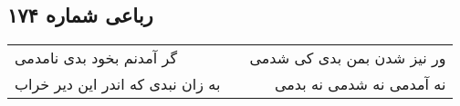 \begin{center}
\section*{رباعی شماره ۱۷۴}
\label{sec:sh174}
\begin{longtable}{l p{0.5cm} r}
گر آمدنم بخود بدی نامدمی
&&
ور نیز شدن بمن بدی کی شدمی
\\
به زان نبدی که اندر این دیر خراب
&&
نه آمدمی نه شدمی نه بدمی
\\
\end{longtable}
\end{center}
